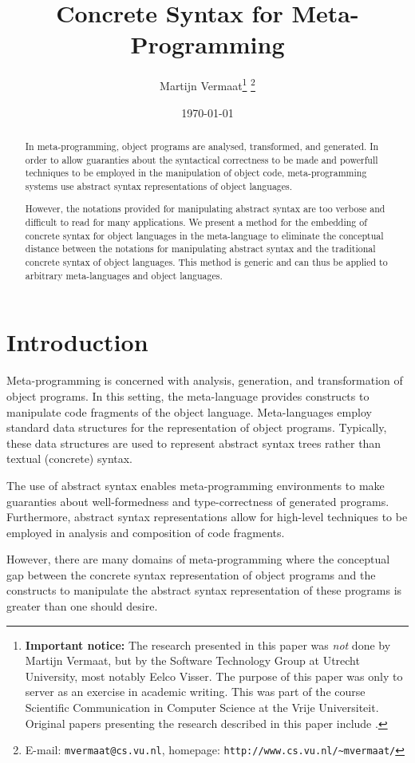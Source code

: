 \documentclass[a4paper,11pt]{article}
\title{Concrete Syntax for Meta-Programming}
\author{Martijn Vermaat\footnote{{\bf Important notice:}
    The research presented in this paper
    was \emph{not} done by Martijn Vermaat, but by the Software
    Technology Group at Utrecht University, most notably Eelco
    Visser.
    The purpose of this paper was only to server as an exercise
    in academic writing. This was part of the course Scientific
    Communication in Computer Science at the Vrije Universiteit.
    Original papers presenting the research described in this
    paper include \cite{Vis02,Brav04}.
} \footnote{E-mail: \texttt{mvermaat@cs.vu.nl}, homepage: \texttt{http://www.cs.vu.nl/\~{}mvermaat/}}}
\date{\today}
\begin{document}
\maketitle


\lstset{
  numbers=none,
  basicstyle=\footnotesize\ttfamily,
  frame=tb,
  language=Pascal,
  captionpos=b,
  xleftmargin=1em,
  xrightmargin=1em,
  aboveskip=1em,
  belowskip=1em
}


\begin{abstract}
In meta-programming, object programs are analysed, transformed, and
generated. In order to allow guaranties about the syntactical correctness to be
made and powerfull techniques to be employed in the manipulation of
object code, meta-programming systems use abstract syntax representations
of object languages.

However, the notations provided for manipulating abstract syntax are
too verbose and difficult to read for many applications. We present
a method for the embedding of concrete syntax for object languages in
the meta-language to eliminate the conceptual distance between the
notations for manipulating abstract syntax and the traditional concrete
syntax of object languages. This method is generic and can thus be
applied to arbitrary meta-languages and object languages.
\end{abstract}


\section{Introduction}\label{sec:introduction}

Meta-programming is concerned with analysis, generation, and transformation
of object programs. In this setting, the meta-language provides constructs
to manipulate code fragments of the object language. Meta-languages employ
standard data structures for the representation of object programs. Typically,
these data structures are used to represent abstract syntax trees rather
than textual (concrete) syntax.

The use of abstract syntax enables meta-programming environments to make
guaranties about well-formedness and type-correctness of generated programs.
Furthermore, abstract syntax representations allow for high-level techniques
to be employed in analysis and composition of code fragments.

However, there are many domains of meta-programming where the conceptual gap
between the concrete syntax representation of object programs and the constructs
to manipulate the abstract syntax representation of these programs is greater
than one should desire.
\end{document}
